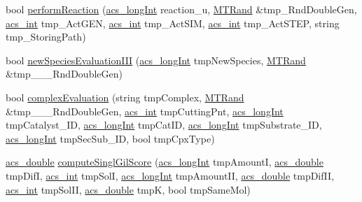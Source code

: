 \begin{DoxyCompactItemize}
\item 
bool \hyperlink{a00014_a1db4e67ba458a54f4fab3e10a203765c}{perform\-Reaction} (\hyperlink{a00072_a19319d75f02db4308bc5c0026d98cd85}{acs\-\_\-long\-Int} reaction\-\_\-u, \hyperlink{a00016}{M\-T\-Rand} \&tmp\-\_\-\-Rnd\-Double\-Gen, \hyperlink{a00072_a8d277355641a098190360234e2ebde35}{acs\-\_\-int} tmp\-\_\-\-Act\-G\-E\-N, \hyperlink{a00072_a8d277355641a098190360234e2ebde35}{acs\-\_\-int} tmp\-\_\-\-Act\-S\-I\-M, \hyperlink{a00072_a8d277355641a098190360234e2ebde35}{acs\-\_\-int} tmp\-\_\-\-Act\-S\-T\-E\-P, string tmp\-\_\-\-Storing\-Path)
\item 
bool \hyperlink{a00014_a4fe7891fb38f3f25bb82769af0ddfe19}{new\-Species\-Evaluation\-I\-I\-I} (\hyperlink{a00072_a19319d75f02db4308bc5c0026d98cd85}{acs\-\_\-long\-Int} tmp\-New\-Species, \hyperlink{a00016}{M\-T\-Rand} \&tmp\-\_\-\-\_\-\-\_\-\-Rnd\-Double\-Gen)
\item 
bool \hyperlink{a00014_a5ee6b203f077de1467aa72042814db7d}{complex\-Evaluation} (string tmp\-Complex, \hyperlink{a00016}{M\-T\-Rand} \&tmp\-\_\-\-\_\-\-\_\-\-Rnd\-Double\-Gen, \hyperlink{a00072_a8d277355641a098190360234e2ebde35}{acs\-\_\-int} tmp\-Cutting\-Pnt, \hyperlink{a00072_a19319d75f02db4308bc5c0026d98cd85}{acs\-\_\-long\-Int} tmp\-Catalyst\-\_\-\-I\-D, \hyperlink{a00072_a19319d75f02db4308bc5c0026d98cd85}{acs\-\_\-long\-Int} tmp\-Cat\-I\-D, \hyperlink{a00072_a19319d75f02db4308bc5c0026d98cd85}{acs\-\_\-long\-Int} tmp\-Substrate\-\_\-\-I\-D, \hyperlink{a00072_a19319d75f02db4308bc5c0026d98cd85}{acs\-\_\-long\-Int} tmp\-Sec\-Sub\-\_\-\-I\-D, bool tmp\-Cpx\-Type)
\item 
\hyperlink{a00072_ab776853a005fcbf56af0424a2a4dd607}{acs\-\_\-double} \hyperlink{a00014_ae1270b9c235dd6b28413075197dba8e0}{compute\-Singl\-Gil\-Score} (\hyperlink{a00072_a19319d75f02db4308bc5c0026d98cd85}{acs\-\_\-long\-Int} tmp\-Amount\-I, \hyperlink{a00072_ab776853a005fcbf56af0424a2a4dd607}{acs\-\_\-double} tmp\-Dif\-I, \hyperlink{a00072_a8d277355641a098190360234e2ebde35}{acs\-\_\-int} tmp\-Sol\-I, \hyperlink{a00072_a19319d75f02db4308bc5c0026d98cd85}{acs\-\_\-long\-Int} tmp\-Amount\-I\-I, \hyperlink{a00072_ab776853a005fcbf56af0424a2a4dd607}{acs\-\_\-double} tmp\-Dif\-I\-I, \hyperlink{a00072_a8d277355641a098190360234e2ebde35}{acs\-\_\-int} tmp\-Sol\-I\-I, \hyperlink{a00072_ab776853a005fcbf56af0424a2a4dd607}{acs\-\_\-double} tmp\-K, bool tmp\-Same\-Mol)
\item 

\end{DoxyCompactItemize}
